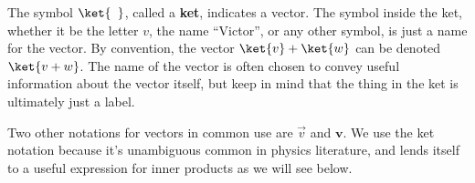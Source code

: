 
The symbol $\ket{\phantom{v}}$, called a \textbf{ket}, indicates a vector.
The symbol inside the ket, whether it be the letter $v$, the name ``Victor'', or any other symbol, is just a name for the vector.
By convention, the vector $\ket{v} + \ket{w}$ can be denoted $\ket{v+w}$.
The name of the vector is often chosen to convey useful information about the vector itself, but keep in mind that the thing in the ket is ultimately just a label.

Two other notations for vectors in common use are $\vec{v}$ and $\mathbf{v}$.
We use the ket notation because it's unambiguous common in physics literature, and lends itself to a useful expression for inner products as we will see below.



